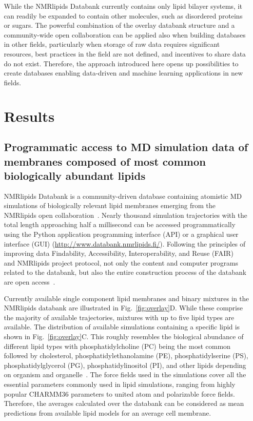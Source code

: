 \documentclass[fleqn,10pt]{wlscirep}
\begin{document}
While the NMRlipids Databank currently contains only lipid bilayer systems, it can readily be expanded to contain other molecules, such as disordered proteins or sugars. The powerful combination of the overlay databank structure and a community-wide open collaboration can be applied also when building databases in other fields, particularly when storage of raw data requires significant resources, best practices in the field are not defined, and incentives to share data do not exist. Therefore, the approach introduced here opens up possibilities to create databases enabling data-driven and machine learning applications in new fields.


\section{Results}

\subsection{Programmatic access to MD simulation data of membranes composed of most common biologically abundant lipids}

NMRlipids Databank is a community-driven database containing atomistic MD simulations of biologically relevant lipid membranes emerging from the NMRlipids open collaboration~\cite{botan15,ollila16,catte16,antila19,bacle21}. Nearly thousand simulation trajectories with the total length approaching half a millisecond can be accessed programmatically using the Python application programming interface (API) or a graphical user interface (GUI) (\url{http://www.databank.nmrlipids.fi/}). Following the principles of improving data Findability, Accessibility, Interoperability, and Reuse (FAIR)~\cite{wilkinson16} and NMRlipids project protocol, not only the content and computer programs related to the databank, but also the entire construction process of the databank are open access~\cite{botan15}. 

Currently available single component lipid membranes and binary mixtures in the NMRlipids databank are illustrated in Fig.~\ref{fig:overlay}D. While these comprise the majority of available trajectories, mixtures with up to five lipid types are available. The distribution of available simulations containing a specific lipid is shown in Fig.~\ref{fig:overlay}C. This roughly resembles the biological abundance of different lipid types with phosphatidylcholine (PC) being the most common followed by cholesterol, phosphatidylethanolamine (PE), phosphatidylserine (PS), phosphatidylglycerol (PG), phosphatidylinositol (PI), and other lipids depending on organism and organelle~\cite{vanmeer08}. The force fields used in the simulations cover all the essential parameters commonly used in lipid simulations, ranging from highly popular CHARMM36 parameters to united atom and polarizable force fields. Therefore, the averages calculated over the databank can be considered as mean predictions from available lipid models for an average cell membrane.
\end{document}
